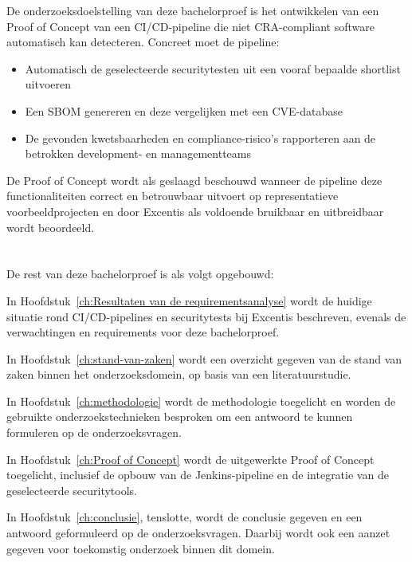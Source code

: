 De onderzoeksdoelstelling van deze bachelorproef is het ontwikkelen van een Proof of Concept van een CI/CD-pipeline die niet CRA-compliant software automatisch kan detecteren. Concreet moet de pipeline:
\begin{itemize}
  \item Automatisch de geselecteerde securitytesten uit een vooraf bepaalde shortlist uitvoeren
  \item Een SBOM genereren en deze vergelijken met een CVE-database
  \item De gevonden kwetsbaarheden en compliance-risico's rapporteren aan de betrokken development- en managementteams
\end{itemize}
De Proof of Concept wordt als geslaagd beschouwd wanneer de pipeline deze functionaliteiten correct en betrouwbaar uitvoert op representatieve voorbeeldprojecten en door Excentis als voldoende bruikbaar en uitbreidbaar wordt beoordeeld.

\section{}%
\label{sec:opzet-bachelorproef}


De rest van deze bachelorproef is als volgt opgebouwd:

In Hoofdstuk~\ref{ch:Resultaten van de requirementsanalyse} wordt de huidige situatie rond CI/CD-pipelines en securitytests bij Excentis beschreven, evenals de verwachtingen en requirements voor deze bachelorproef. 

In Hoofdstuk~\ref{ch:stand-van-zaken} wordt een overzicht gegeven van de stand van zaken binnen het onderzoeksdomein, op basis van een literatuurstudie.

In Hoofdstuk~\ref{ch:methodologie} wordt de methodologie toegelicht en worden de gebruikte onderzoekstechnieken besproken om een antwoord te kunnen formuleren op de onderzoeksvragen.


In Hoofdstuk~\ref{ch:Proof of Concept} wordt de uitgewerkte Proof of Concept toegelicht, inclusief de opbouw van de Jenkins-pipeline en de integratie van de geselecteerde securitytools.

In Hoofdstuk~\ref{ch:conclusie}, tenslotte, wordt de conclusie gegeven en een antwoord geformuleerd op de onderzoeksvragen. Daarbij wordt ook een aanzet gegeven voor toekomstig onderzoek binnen dit domein.